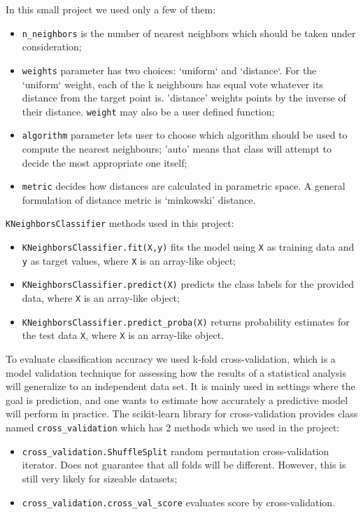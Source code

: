 \documentclass[a4paper,10pt]{article}
\begin{document}
In this small project we used only a few of them:
\begin{itemize}
    \item \texttt{n\_neighbors} is the number of nearest neighbors which should be taken under consideration;
    \item \texttt{weights} parameter has two choices: ‘uniform‘ and ‘distance‘. For the ‘uniform‘ weight, each of the k neighbours has equal vote whatever its distance from the target point is. 'distance' weights points by the inverse of their distance. \texttt{weight} may also be a user defined function;
    \item \texttt{algorithm} parameter lets user to choose which algorithm should be used to compute the nearest neighbours; 'auto' means that class will attempt to decide the most appropriate one itself;
    \item \texttt{metric} decides how distances are calculated in parametric space. A general formulation of distance metric is ‘minkowski’ distance.
\end{itemize}


\texttt{KNeighborsClassifier} methods used in this project:
\begin{itemize}
    \item \texttt{KNeighborsClassifier.fit(X,y)} fits the model using \texttt{X} as training data and \texttt{y} as target values, where \texttt{X} is an array-like object;
    \item \texttt{KNeighborsClassifier.predict(X)} predicts the class labels for the provided data, where \texttt{X} is an array-like object;
    \item \texttt{KNeighborsClassifier.predict\_proba(X)} returns probability estimates for the test data \texttt{X}, where \texttt{X} is an array-like object.
\end{itemize}    
    
To evaluate classification accuracy we used k-fold cross-validation, which is a model validation technique for assessing how the results of a statistical analysis will generalize
to an independent data set. It is mainly used in settings where the goal is prediction, and one wants to estimate how accurately a predictive model will perform in practice. 
The scikit-learn library for cross-validation provides class named \texttt{cross\_validation} which has 2 methods which we used in the project:
\begin{itemize}
  \item \texttt{cross\_validation.ShuffleSplit} random permutation cross-validation iterator. Does not guarantee that all folds will be different. However, this is still very likely for sizeable datasets;
  \item \texttt{cross\_validation.cross\_val\_score} evaluates score by cross-validation.
\end{itemize}
\end{document}
